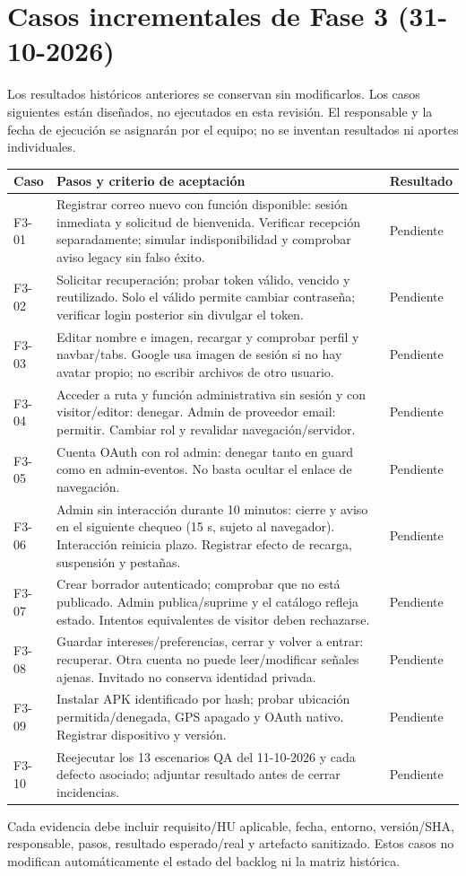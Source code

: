 \documentclass[11pt,a4paper]{article}
\begin{document}
\section{Casos incrementales de Fase 3 (31-10-2026)}
Los resultados históricos anteriores se conservan sin modificarlos. Los casos siguientes
están diseñados, no ejecutados en esta revisión. El responsable y la fecha de ejecución
se asignarán por el equipo; no se inventan resultados ni aportes individuales.
\begin{longtable}{p{1.5cm}p{10.4cm}p{2.1cm}}
\toprule Caso & Pasos y criterio de aceptación & Resultado \\\midrule\endhead
F3-01 & Registrar correo nuevo con función disponible: sesión inmediata y solicitud de bienvenida. Verificar recepción separadamente; simular indisponibilidad y comprobar aviso legacy sin falso éxito. & Pendiente \\
F3-02 & Solicitar recuperación; probar token válido, vencido y reutilizado. Solo el válido permite cambiar contraseña; verificar login posterior sin divulgar el token. & Pendiente \\
F3-03 & Editar nombre e imagen, recargar y comprobar perfil y navbar/tabs. Google usa imagen de sesión si no hay avatar propio; no escribir archivos de otro usuario. & Pendiente \\
F3-04 & Acceder a ruta y función administrativa sin sesión y con visitor/editor: denegar. Admin de proveedor email: permitir. Cambiar rol y revalidar navegación/servidor. & Pendiente \\
F3-05 & Cuenta OAuth con rol admin: denegar tanto en guard como en admin-eventos. No basta ocultar el enlace de navegación. & Pendiente \\
F3-06 & Admin sin interacción durante 10 minutos: cierre y aviso en el siguiente chequeo (15 s, sujeto al navegador). Interacción reinicia plazo. Registrar efecto de recarga, suspensión y pestañas. & Pendiente \\
F3-07 & Crear borrador autenticado; comprobar que no está publicado. Admin publica/suprime y el catálogo refleja estado. Intentos equivalentes de visitor deben rechazarse. & Pendiente \\
F3-08 & Guardar intereses/preferencias, cerrar y volver a entrar: recuperar. Otra cuenta no puede leer/modificar señales ajenas. Invitado no conserva identidad privada. & Pendiente \\
F3-09 & Instalar APK identificado por hash; probar ubicación permitida/denegada, GPS apagado y OAuth nativo. Registrar dispositivo y versión. & Pendiente \\
F3-10 & Reejecutar los 13 escenarios QA del 11-10-2026 y cada defecto asociado; adjuntar resultado antes de cerrar incidencias. & Pendiente \\
\bottomrule\end{longtable}
Cada evidencia debe incluir requisito/HU aplicable, fecha, entorno, versión/SHA,
responsable, pasos, resultado esperado/real y artefacto sanitizado. Estos casos no
modifican automáticamente el estado del backlog ni la matriz histórica.
\end{document}
